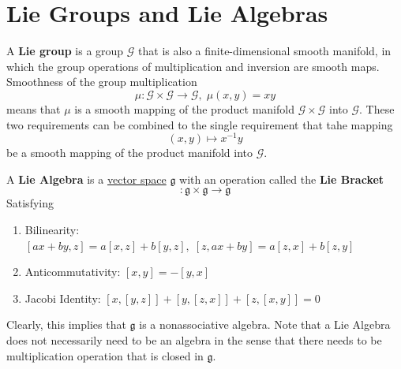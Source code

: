 \section{Lie Groups and Lie Algebras}

  \begin{definition}
    \label{def:lie-group}
    A \textbf{Lie group} is a group $\mathcal{G}$ that is also a finite-dimensional smooth manifold, in which the group operations of multiplication and inversion are smooth maps. Smoothness of the group multiplication
    \begin{equation}
      \mu: \mathcal{G} \times \mathcal{G} \rightarrow \mathcal{G}, \; \mu(x, y) = x y
    \end{equation}
    means that $\mu$ is a smooth mapping of the product manifold $\mathcal{G} \times \mathcal{G}$ into $\mathcal{G}$. These two requirements can be combined to the single requirement that tahe mapping 
    \begin{equation}
      (x, y) \mapsto x^{-1} y
    \end{equation}
    be a smooth mapping of the product manifold into $\mathcal{G}$. 
  \end{definition}

  \begin{definition}
    \label{def:lie-algebra}
    A \textbf{Lie Algebra} is a \hyperref[def:vector-space]{vector space} $\mathfrak{g}$ with an operation called the \textbf{Lie Bracket} 
    \begin{equation}
      [\cdot, \cdot]: \mathfrak{g} \times \mathfrak{g} \rightarrow \mathfrak{g}
    \end{equation}
    Satisfying
    \begin{enumerate}
      \item Bilinearity: $[ax + by, z] = a[x,z] + b[y,z], \; [z, ax + by] = a[z, x] + b[z,y]$
      \item Anticommutativity: $[x,y] = -[y,x]$
      \item Jacobi Identity: $[x,[y,z]] + [y,[z,x]] + [z,[x,y]] = 0$
    \end{enumerate}
    Clearly, this implies that $\mathfrak{g}$ is a nonassociative algebra. Note that a Lie Algebra does not necessarily need to be an algebra in the sense that there needs to be multiplication operation that is closed in $\mathfrak{g}$. 
  \end{definition}

